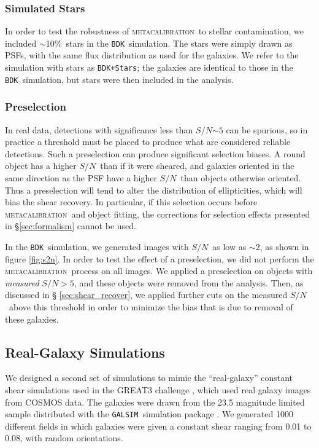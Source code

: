 \documentclass[iop, twocolappendix, appendixfloats, numberedappendix, apj]{emulateapj}
\newcommand{\snr}{$S/N$}
\newcommand{\mcal}{\textsc{metacalibration}}
\newcommand{\nsimNstarperc}{10\%}
\newcommand{\bdksim}{\texttt{BDK}}
\newcommand{\bdstar}{\texttt{BDK+Stars}}
\newcommand{\galsim}{\texttt{GALSIM}}
\begin{document}
\subsubsection{Simulated Stars}

In order to test the robustness of \mcal\ to stellar contamination, we included
$\sim$\nsimNstarperc\ stars in the \bdksim\ simulation.  The stars were simply
drawn as PSFs, with the same flux distribution as used for the galaxies.  We
refer to the simulation with stars as \bdstar; the galaxies are identical to
those in the \bdksim\ simulation, but stars were then included in the analysis.

\subsubsection{Preselection} \label{sec:preselect}

In real data, detections with significance less than \snr$\sim 5$ can be
spurious, so in practice a threshold must be placed to produce what are
considered reliable detections.  Such a preselection can produce significant
selection biases.  A round object has a higher \snr\ than if it were sheared, and
galaxies oriented in the same direction as the PSF have a higher \snr\ than
objects otherwise oriented.  Thus a preselection will tend to alter the
distribution of ellipticities, which will bias the shear recovery.  In
particular, if this selection occurs before \mcal\ and object fitting, the
corrections for selection effects presented in \S \ref{sec:formalism} cannot be
used.

In the \bdksim\ simulation, we generated images with \snr\ as low as $\sim 2$,
as shown in figure \ref{fig:s2n}.  In order to test the effect of a
preselection, we did not perform the \mcal\ process on all images.  We applied
a preselection on objects with {\em measured} \snr$ > 5$, and these objects
were removed from the analysis.  Then, as discussed in \S
\ref{sec:shear_recover}, we applied further cuts on the measured \snr\ above
this threshold in order to minimize the bias that is due to removal of these galaxies.


\pagebreak
\subsection{Real-Galaxy Simulations} \label{sec:cosmosim}

We designed a second set of simulations to mimic the ``real-galaxy'' constant
shear simulations used in the GREAT3 challenge \citep{great3}, which used
real galaxy images from COSMOS data.  The galaxies were
drawn from the 23.5 magnitude limited sample distributed
with the \galsim\ simulation package \citep{GALSIM2015}.  We generated 1000
different fields in which galaxies were given a constant shear ranging from
0.01 to 0.08, with random orientations.
\end{document}
